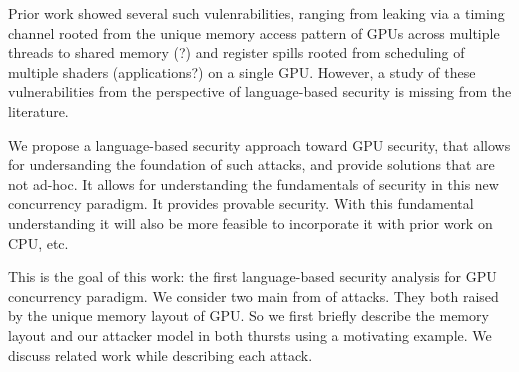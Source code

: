 %
%
%
Prior work showed several such vulenrabilities, ranging from leaking via a timing channel rooted from the unique memory access pattern of GPUs across multiple threads to shared memory (?) and register spills rooted from scheduling of multiple shaders (applications?) on a single GPU.
%
However, a study of these vulnerabilities from the perspective of language-based security is missing from the literature.
%

We propose a language-based security approach toward GPU security, that allows for undersanding the foundation of such attacks, and provide solutions that are not ad-hoc.
%
It allows for understanding the fundamentals of security in this new concurrency paradigm.
%
It provides provable security.
%
With this fundamental understanding it will also be more feasible to incorporate it with prior work on CPU, etc.


This is the goal of this work: the first language-based security analysis for GPU concurrency paradigm.
%
We consider two main from of attacks.
%
They both raised by the unique memory layout of GPU.
%
So we first briefly describe the memory layout and our attacker model in both thursts using a motivating example.
%
We discuss related work while describing each attack.










